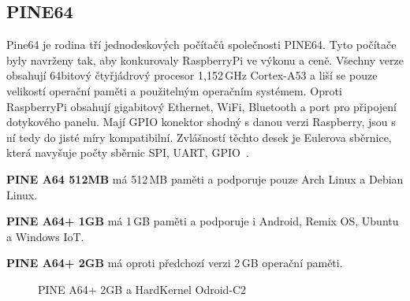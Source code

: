 	\subsection{PINE64}
Pine64 je rodina tří jednodeskových počítačů společnosti PINE64. Tyto počítače byly navrženy tak, aby konkurovaly RaspberryPi ve výkonu a ceně. Všechny verze obsahují 64bitový čtyřjádrový procesor 1,152\,GHz Cortex-A53 a liší se pouze velikostí operační paměti a použitelným operačním systémem. Oproti RaspberryPi obsahují gigabitový Ethernet, WiFi, Bluetooth a port pro připojení dotykového panelu. Mají GPIO konektor shodný s danou verzi Raspberry, jsou s ní tedy do jisté míry kompatibilní. Zvlášností těchto desek je Eulerova sběrnice, která navyšuje počty sběrnic SPI, UART, GPIO~\cite{Pine64}.

\textbf{PINE A64 512MB} má 512\,MB paměti a podporuje pouze Arch Linux a Debian Linux.

\textbf{PINE A64+ 1GB} má 1\,GB paměti a podporuje i Android, Remix OS, Ubuntu a Windows IoT.

\textbf{PINE A64+ 2GB} má oproti předchozí verzi 2\,GB operační paměti.

	\begin{figure}[!ht]
    \centering
			\hspace*{5mm}
			\caption{PINE A64+ 2GB a HardKernel Odroid-C2}
			\vspace{-10pt}
\end{figure}

\newpage{}
